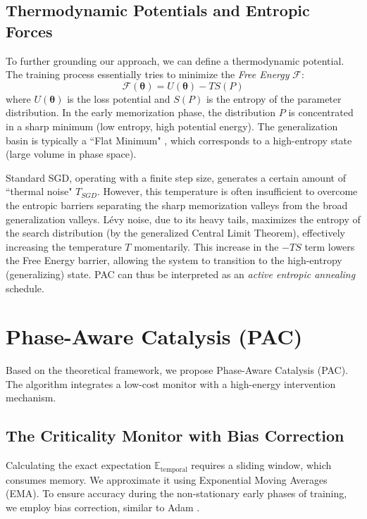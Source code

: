 \documentclass{article}
\theoremstyle{plain}
\theoremstyle{definition}
\theoremstyle{remark}
\newcommand{\E}{\mathbb{E}}
\newcommand{\thetavec}{\boldsymbol{\theta}}
\newcommand{\free}{\mathcal{F}} %
\begin{document}
\subsection{Thermodynamic Potentials and Entropic Forces}
\label{subsec:thermo}
To further grounding our approach, we can define a thermodynamic potential. The training process essentially tries to minimize the \textit{Free Energy} $\free$:
\begin{equation}
    \free(\thetavec) = U(\thetavec) - T S(P)
\end{equation}
where $U(\thetavec)$ is the loss potential and $S(P)$ is the entropy of the parameter distribution.
In the early memorization phase, the distribution $P$ is concentrated in a sharp minimum (low entropy, high potential energy). The generalization basin is typically a ``Flat Minimum" \cite{foret2020sharpness}, which corresponds to a high-entropy state (large volume in phase space).

Standard SGD, operating with a finite step size, generates a certain amount of ``thermal noise" $T_{SGD}$. However, this temperature is often insufficient to overcome the entropic barriers separating the sharp memorization valleys from the broad generalization valleys. Lévy noise, due to its heavy tails, maximizes the entropy of the search distribution (by the generalized Central Limit Theorem), effectively increasing the temperature $T$ momentarily. This increase in the $-TS$ term lowers the Free Energy barrier, allowing the system to transition to the high-entropy (generalizing) state. PAC can thus be interpreted as an \textit{active entropic annealing} schedule.

\section{Phase-Aware Catalysis (PAC)}
\label{sec:method}

Based on the theoretical framework, we propose Phase-Aware Catalysis (PAC). The algorithm integrates a low-cost monitor with a high-energy intervention mechanism.

\subsection{The Criticality Monitor with Bias Correction}
Calculating the exact expectation $\E_{\text{temporal}}$ requires a sliding window, which consumes memory. We approximate it using Exponential Moving Averages (EMA). To ensure accuracy during the non-stationary early phases of training, we employ bias correction, similar to Adam \cite{kingma2014adam}.
\end{document}

